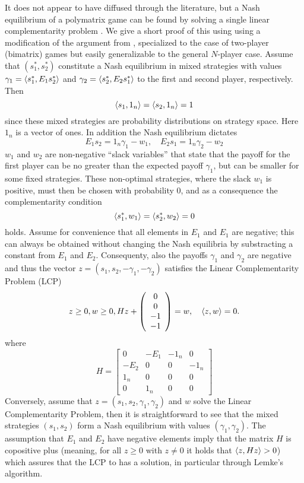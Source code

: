 It does not appear to have diffused through the literature, but a Nash equilibrium of a polymatrix game can be found by solving a single linear complementarity problem \citep{miller1991copositive}. We give a short proof of this using using a modification of the argument from \citep{miller1991copositive}, specialized to the case of two-player (bimatrix) games but easily generalizable to the general $N$-player case. Assume that $(s^*_1,s^*_2)$ constitute a Nash equilibrium in mixed strategies with values $\gamma_1 = \left \langle s^*_1,E_1 s^*_2 \right \rangle$ and  $\gamma_2 = \left \langle s^*_2,E_2 s^*_1 \right \rangle$ to the first and second player, respectively. Then
\[
  \left \langle s_1,1_n \right \rangle =
  \left \langle s_2,1_n \right \rangle =
  1
\]
since these mixed strategies are probability distributions on strategy space. Here $1_n$ is a vector of ones. In addition the Nash equilibrium dictates
\[
  E_1 s_2 = 1_n \gamma_1 - w_1
  ,\quad
  E_2 s_1 = 1_n \gamma_2  - w_2
\]
$w_1$ and $w_2$ are non-negative ``slack variables'' that state that the payoff for the first player can be no greater than the expected payoff $\gamma_1$, but can be smaller for some fixed strategies. These non-optimal strategies, where the slack $w_1$ is positive, must then be chosen with probability 0, and as a consequence the complementarity condition
\[
  \left \langle s^*_1,w_1 \right \rangle =   \left \langle s^*_2,w_2 \right \rangle = 0
\]
holds. Assume for convenience that all elements in $E_1$ and $E_1$ are negative; this can always be obtained without changing the Nash equilibria by substracting a constant from $E_1$ and $E_2$. Consequenty, also the payoffs $\gamma_1$ and $\gamma_2$ are negative and thus the vector $z = (s_1,s_2,-\gamma_1,-\gamma_2)$ satisfies the Linear Complementarity Problem (LCP)
\begin{equation}
  z \geq 0,
  w \geq 0 ,
  H
  z
  +
  \left(
    \begin{array}{c}
      0 \\
      0 \\
      -1 \\
      -1
    \end{array}
  \right)
  =
  w
  ,
  \quad
  \left \langle z,w \right \rangle = 0
  .  \label{eq:lcp}
\end{equation}
where
\[
  H =
  \left[
    \begin{array}{cccc}
      0 & -E_1 & -1_n & 0 \\ -E_2 & 0 & 0 & -1_n \\
      1_n & 0 & 0 & 0 \\
      0 & 1_n & 0 & 0
    \end{array}
  \right]
\]
Conversely, assume that $z=(s_1,s_2,\gamma_1,\gamma_2)$ and $w$ solve the Linear Complementarity Problem, then it is straightforward to see that the mixed strategies $(s_1,s_2)$ form a Nash equilibrium with values $(\gamma_1,\gamma_2)$. The assumption that $E_1$ and $E_2$ have negative elements imply that the matrix $H$ is copositive plus (meaning, for all $z\geq0$ with $z\neq0$ it holds that $\left \langle z,Hz \right \rangle>0$) which assures that the LCP to has a solution, in particular through Lemke's algorithm.


